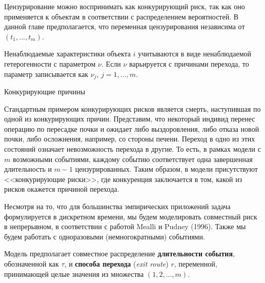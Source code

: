 Цензурирование можно воспринимать как конкурирующий риск, так как оно применяется к объектам в соответствии с распределением вероятностей. В данной главе предполагается, что переменная цензурирования независима от $(t_1, ..., t_m)$.

Ненаблюдаемые характеристики объекта $i$ учитываются в виде ненаблюдаемой гетерогенности с параметром $\nu$. Если $\nu$ варьируется с причинами перехода, то параметр записывается как $\nu_j$, $j = 1, ..., m$.

        \begin{center}Конкурирующие причины\end{center}
        \noindent
Стандартным примером конкурирующих рисков является смерть, наступившая по одной из конкурирующих причин. Представим, что некоторый индивид перенес операцию по пересадке почки и ожидает либо выздоровления, либо отказа новой почки, либо осложнения, например, со стороны печени. Переход в одно из этих состояний означает невозможность перехода в другие. То есть, в рамках модели с $m$ возможными событиями, каждому событию соответствует одна завершенная длительность и $m - 1$ цензурированных. Таким образом, в модели присутствуют <<конкурирующие риски>>, где конкуренция заключается в том, какой из рисков окажется причиной перехода.

Несмотря на то, что для большинства эмпирических приложений задача формулируется в дискретном времени, мы будем моделировать совместный риск в непрерывном, в соответствии с работой Mealli и Pudney (1996). Также мы будем работать с одноразовыми (немногократными) событиями.

Модель предполагает совместное распределение \textbf{длительности события}, обозначенной как $\tau$, и \textbf{способа перехода} (\textit{exit route}) $r$, переменной, принимающей целые значения из множества $(1, 2, ..., m)$.

